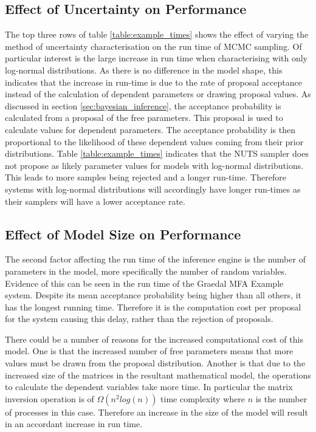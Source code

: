 \documentclass[ %
                    author={Tom Jager},
                supervisor={Dr. Daniel Schien},
                    degree={MEng},
                     title={A Bayesian Inference Engine for Calibrating Uncertainty over UMIS Structured MFA Systems},
                  subtitle={},
                      type={research},
                      year={2019} ]{dissertation}
\begin{document}
\subsection{Effect of Uncertainty on Performance}
\label{sec:uncertainty_performance}
The top three rows of table \ref{table:example_times} shows the effect of varying the method of uncertainty characterisation on the run time of MCMC sampling. Of particular interest is the large increase in run time when characterising with only log-normal distributions. As there is no difference in the model shape, this indicates that the increase in run-time is due to the rate of proposal acceptance instead of the calculation of dependent parameters or drawing proposal values. As discussed in section \ref{sec:bayesian_inference}, the acceptance probability is calculated from a proposal of the free parameters. This proposal is used to calculate values for dependent parameters. The acceptance probability is then proportional to the likelihood of these dependent values coming from their prior distributions. Table \ref{table:example_times} indicates that the NUTS sampler does not propose as likely parameter values for models with log-normal distributions. This leads to more samples being rejected and a longer run-time. Therefore systems with log-normal distributions will accordingly have longer run-times as their samplers will have a lower acceptance rate.

\subsection{Effect of Model Size on Performance}
The second factor affecting the run time of the inference engine is the number of parameters in the model, more specifically the number of random variables. Evidence of this can be seen in the run time of the Graedal MFA Example system. Despite its mean acceptance probability being higher than all others, it has the longest running time. Therefore it is the computation cost per proposal for the system causing this delay, rather than the rejection of proposals. 

There could be a number of reasons for the increased computational cost of this model. One is that the increased number of free parameters means that more values must be drawn from the proposal distribution. Another is that due to the increased size of the matrices in the resultant mathematical model, the operations to calculate the dependent variables take more time. In particular the matrix inversion operation is of $\Omega(n^2log(n))$ time complexity \cite{tveit2003complexity} where $n$ is the number of processes in this case. Therefore an increase in the size of the model will result in an accordant increase in run time.
\end{document}
